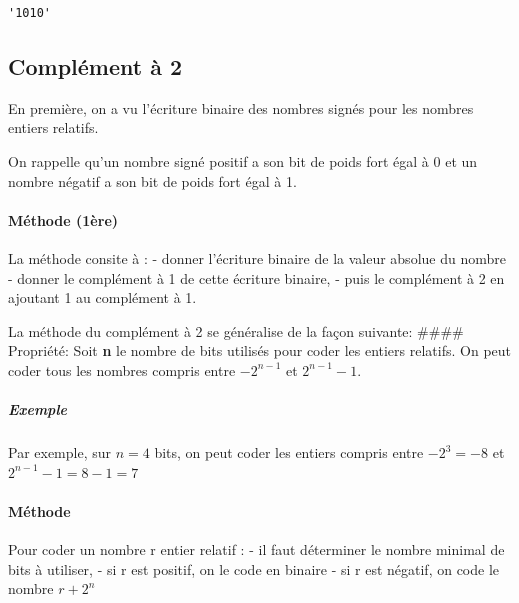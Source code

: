 \documentclass[12pt]{article}
\makeatletter
\newcommand{\boxspacing}{\kern\kvtcb@left@rule\kern\kvtcb@boxsep}
\newcommand{\prompt}[4]{
        {\ttfamily\llap{{\color{#2}[#3]:\hspace{3pt}#4}}\vspace{-\baselineskip}}
    }
\makeatother
\begin{document}
            \begin{tcolorbox}[breakable, size=fbox, boxrule=.5pt, pad at break*=1mm, opacityfill=0]
\prompt{Out}{outcolor}{4}{\boxspacing}
\begin{Verbatim}[commandchars=\\\{\}]
'1010'
\end{Verbatim}
\end{tcolorbox}
        
    \hypertarget{compluxe9ment-uxe0-2}{%
\subsection*{Complément à 2}\label{compluxe9ment-uxe0-2}}

En première, on a vu l'écriture binaire des nombres signés pour les
nombres entiers relatifs.

On rappelle qu'un nombre signé positif a son bit de poids fort égal à 0
et un nombre négatif a son bit de poids fort égal à 1.

\hypertarget{muxe9thode-1uxe8re}{%
\paragraph{Méthode (1ère)}\label{muxe9thode-1uxe8re}}

La méthode consite à : - donner l'écriture binaire de la valeur absolue
du nombre - donner le complément à 1 de cette écriture binaire, - puis
le complément à 2 en ajoutant 1 au complément à 1.

La méthode du complément à 2 se généralise de la façon suivante:
\#\#\#\# Propriété: Soit \textbf{n} le nombre de bits utilisés pour
coder les entiers relatifs. On peut coder tous les nombres compris entre
\(-2^{n-1}\) et \(2^{n-1}-1\).

\hypertarget{exemple}{%
\subparagraph{Exemple}\label{exemple}}

Par exemple, sur \(n=4\) bits, on peut coder les entiers compris entre
\(-2^{3}=-8\) et \(2^{n-1}-1=8-1=7\)

\hypertarget{muxe9thode}{%
\paragraph{Méthode}\label{muxe9thode}}

Pour coder un nombre r entier relatif : - il faut déterminer le nombre
minimal de bits à utiliser, - si r est positif, on le code en binaire -
si r est négatif, on code le nombre \(r+2^{n}\)
\end{document}
